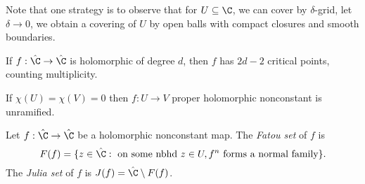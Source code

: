 \documentclass[a4paper]{article}
\begin{document}
Note that one strategy is to observe that for \(U \subseteq \C\), we can cover by \(\delta\)-grid, let \(\delta \to 0\), we obtain a covering of \(U\) by open balls with compact closures and smooth boundaries.

\begin{corollary}
  If \(f: \hat \C \to \hat \C\) is holomorphic of degree \(d\), then \(f\) has \(2d - 2\) critical points, counting multiplicity.
\end{corollary}

\begin{corollary}
  If \(\chi(U) = \chi(V) = 0\) then \(f: U \to V\) proper holomorphic nonconstant is unramified.
\end{corollary}

\begin{definition}
  Let \(f: \hat \C \to \hat \C\) be a holomorphic nonconstant map. The \emph{Fatou set} of \(f\) is
  \[
    F(f) = \{z \in \hat \C: \text{ on some nbhd } z \in U, f^n \text{ forms a normal family}\}.
  \]
  The \emph{Julia set} of \(f\) is \(J(f) = \hat \C \setminus F(f)\).
\end{definition}


\printindex
\end{document}
